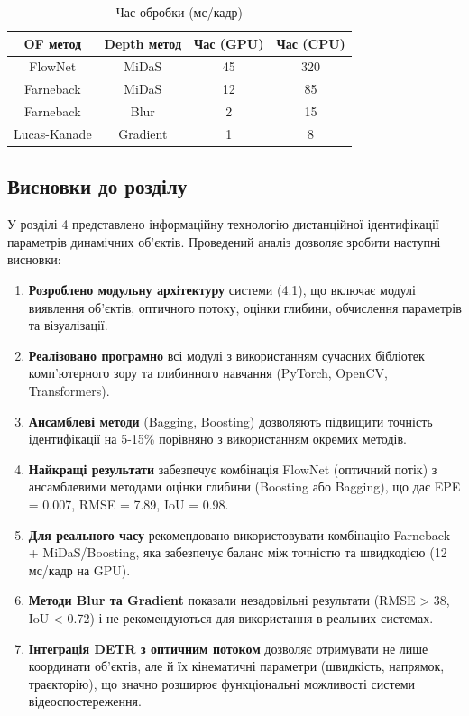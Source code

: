 \documentclass[14pt, a4paper]{extarticle}
\numberwithin{equation}{section}
\begin{document}
\begin{table}[H]
\centering
\caption{Час обробки (мс/кадр)}
\begin{tabular}{|c|c|c|c|}
\hline
\textbf{OF метод} & \textbf{Depth метод} & \textbf{Час (GPU)} & \textbf{Час (CPU)} \\
\hline
FlowNet & MiDaS & 45 & 320 \\
Farneback & MiDaS & 12 & 85 \\
Farneback & Blur & 2 & 15 \\
Lucas-Kanade & Gradient & 1 & 8 \\
\hline
\end{tabular}
\label{tab:time}
\end{table}

\subsection{Висновки до розділу}

У розділі 4 представлено інформаційну технологію дистанційної ідентифікації параметрів динамічних об'єктів. Проведений аналіз дозволяє зробити наступні висновки:

\begin{enumerate}
    \item \textbf{Розроблено модульну архітектуру} системи (4.1), що включає модулі виявлення об'єктів, оптичного потоку, оцінки глибини, обчислення параметрів та візуалізації.
    
    \item \textbf{Реалізовано програмно} всі модулі з використанням сучасних бібліотек комп'ютерного зору та глибинного навчання (PyTorch, OpenCV, Transformers).
    
    \item \textbf{Ансамблеві методи} (Bagging, Boosting) дозволяють підвищити точність ідентифікації на 5-15\% порівняно з використанням окремих методів.
    
    \item \textbf{Найкращі результати} забезпечує комбінація FlowNet (оптичний потік) з ансамблевими методами оцінки глибини (Boosting або Bagging), що дає EPE = 0.007, RMSE = 7.89, IoU = 0.98.
    
    \item \textbf{Для реального часу} рекомендовано використовувати комбінацію Farneback + MiDaS/Boosting, яка забезпечує баланс між точністю та швидкодією (12 мс/кадр на GPU).
    
    \item \textbf{Методи Blur та Gradient} показали незадовільні результати (RMSE > 38, IoU < 0.72) і не рекомендуються для використання в реальних системах.
    
    \item \textbf{Інтеграція DETR з оптичним потоком} дозволяє отримувати не лише координати об'єктів, але й їх кінематичні параметри (швидкість, напрямок, траєкторію), що значно розширює функціональні можливості системи відеоспостереження.
\end{enumerate}
\end{document}
